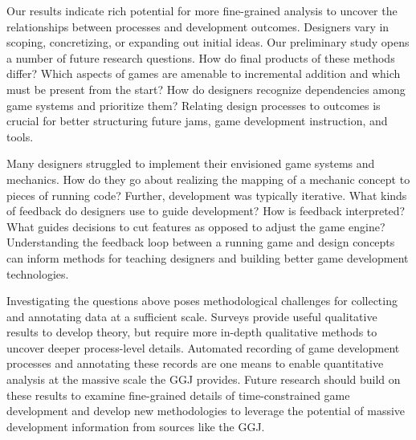 \documentclass{sig-alternate}
\begin{document}
Our results indicate rich potential for more fine-grained analysis to uncover the relationships between processes and development outcomes. Designers vary in scoping, concretizing, or expanding out initial ideas. Our preliminary study opens a number of future research questions. How do final products of these methods differ? Which aspects of games are amenable to incremental addition and which must be present from the start? How do designers recognize dependencies among game systems and prioritize them? Relating design processes to outcomes is crucial for better structuring future jams, game development instruction, and tools.

Many designers struggled to implement their envisioned game systems and mechanics. How do they go about realizing the mapping of a mechanic concept to pieces of running code? Further, development was typically iterative. What kinds of feedback do designers use to guide development? How is feedback interpreted? What guides decisions to cut features as opposed to adjust the game engine? Understanding the feedback loop between a running game and design concepts can inform methods for teaching designers and building better game development technologies.

Investigating the questions above poses methodological challenges for collecting and annotating data at a sufficient scale. Surveys provide useful qualitative results to develop theory, but require more in-depth qualitative methods to uncover deeper process-level details. Automated recording of game development processes and annotating these records are one means to enable quantitative analysis at the massive scale the GGJ provides. 
Future research should build on these results to examine fine-grained details of time-constrained game development and develop new methodologies to leverage the potential of massive development information from sources like the GGJ.







\end{document}
